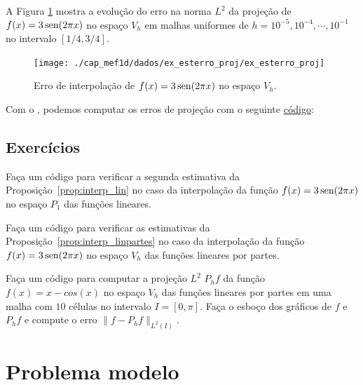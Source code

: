 \begin{ex}\label{ex:esterro_proj}
  A Figura \ref{fig:ex_esterro_proj} mostra a evolução do erro na norma $L^2$ da projeção de $f(x)=3\operatorname{sen}(2\pi x)$ no espaço $V_h$ em malhas uniformes de $h=10^{-5}, 10^{-4}, \cdots, 10^{-1}$ no intervalo $[1/4, 3/4]$.

  \begin{figure}[h!]
    \centering
    \texttt{[image: ./cap\_mef1d/dados/ex\_esterro\_proj/ex\_esterro\_proj]}
    \caption{Erro de interpolação de $f(x)=3\operatorname{sen}(2\pi x)$ no espaço $V_h$.}
    \label{fig:ex_esterro_proj}
  \end{figure}

\ifispython
Com o \fenics, podemos computar os erros de projeção com o seguinte \href{https://github.com/phkonzen/notas/blob/master/src/MetodoElementosFinitos/cap_mef1d/dados/ex_esterro_proj/ex_esterro_proj.py}{código}:

\fi
\end{ex}

\subsection*{Exercícios}

\begin{exer}
  Faça um código para verificar a segunda estimativa da Proposição~\ref{prop:interp_lin} no caso da interpolação da função $f(x) = 3\operatorname{sen}(2\pi x)$ no espaço $P_1$ das funções lineares.
\end{exer}


\begin{exer}
  Faça um código para verificar as estimativas da Proposição~\ref{prop:interp_linpartes} no caso da interpolação da função $f(x) = 3\operatorname{sen}(2\pi x)$ no espaço $V_h$ das funções lineares por partes.
\end{exer}

\begin{exer}
  Faça um código para computar a projeção $L^2$ $P_hf$ da função $f(x) = x - cos(x)$ no espaço $V_h$ das funções lineares por partes em uma malha com $10$ células no intervalo $I = [0, \pi]$. Faça o esboço dos gráficos de $f$ e $P_hf$ e compute o erro $\|f-P_hf\|_{L^2(I)}$.
\end{exer}

\section{Problema modelo}\label{cap_mef1d_sec_modelo}

